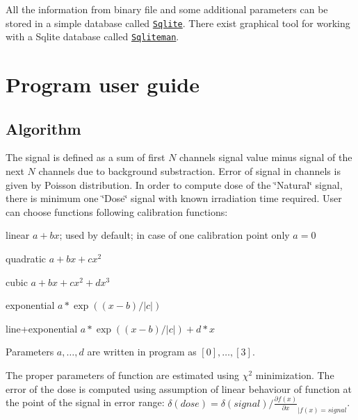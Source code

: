 All the information from binary file and some additional parameters can be stored in a simple database called \href{http://www.sqlite.org}{\tt Sqlite}. There exist graphical tool for working with a Sqlite database called \href{http://www.sqliteman.com}{\tt Sqliteman}.\hypertarget{index_running_code}{}\section{Program user guide}\label{index_running_code}
\hypertarget{index_algorithm}{}\subsection{Algorithm}\label{index_algorithm}
The signal is defined as a sum of first $N$ channels signal value minus signal of the next $N$ channels due to background substraction. Error of signal in channels is given by Poisson distribution. In order to compute dose of the \char`\"{}\-Natural\char`\"{} signal, there is minimum one \char`\"{}\-Dose\char`\"{} signal with known irradiation time required. User can choose functions following calibration functions\-:
\begin{DoxyItemize}
\item linear $a+bx$; used by default; in case of one calibration point only $a=0$
\item quadratic $a+bx+cx^2$
\item cubic $a+bx+cx^2+dx^3$
\item exponential $a*\exp((x-b)/|c|)$
\item line+exponential $a*\exp((x-b)/|c|)+d*x$
\end{DoxyItemize}

Parameters $a,\dots ,d$ are written in program as $[0],\dots ,[3]$.

The proper parameters of function are estimated using $\chi^2$ minimization. The error of the dose is computed using assumption of linear behaviour of function at the point of the signal in error range\-: $\delta(dose)=\delta(signal)/\frac{\partial f(x)}{\partial x}_{|f(x)=signal}$.

